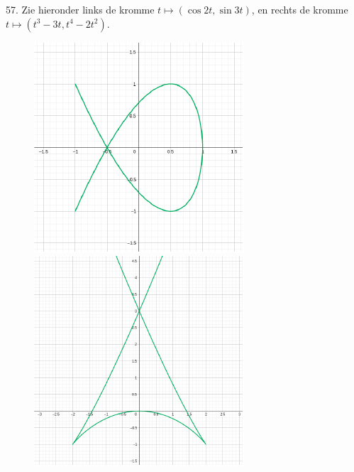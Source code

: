 \clearpage

\begin{problem}{57.}
	Zie hieronder links de kromme $t \mapsto (\cos 2t,\sin 3t)$, en rechts de kromme $t \mapsto (t^3 - 3 t,t^4 - 2 t^2)$.
    \begin{figure}
		\includegraphics{resources/oplossing57a}
		\includegraphics{resources/oplossing57b}
	\end{figure}
\end{problem}

